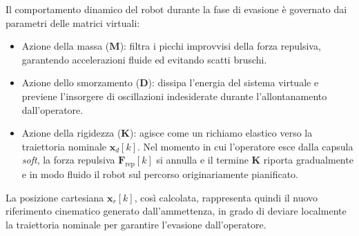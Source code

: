Il comportamento dinamico del robot durante la fase di evasione è governato dai parametri delle matrici virtuali:
\begin{itemize}
	\item Azione della massa ($\boldsymbol{M}$): filtra i picchi improvvisi della forza repulsiva, garantendo accelerazioni fluide ed evitando scatti bruschi.
	\item Azione dello smorzamento ($\boldsymbol{D}$): dissipa l'energia del sistema virtuale e previene l'insorgere di oscillazioni indesiderate durante l'allontanamento dall'operatore.
	\item Azione della rigidezza ($\boldsymbol{K}$): agisce come un richiamo elastico verso la traiettoria nominale $\boldsymbol{x}_d[k]$. Nel momento in cui l'operatore esce dalla capsula \textit{soft}, la forza repulsiva $\boldsymbol{F}_{\text{rep}}[k]$ si annulla e il termine $\boldsymbol{K}$ riporta gradualmente e in modo fluido il robot sul percorso originariamente pianificato.
\end{itemize}

La posizione cartesiana $\boldsymbol{x}_r[k]$, così calcolata, rappresenta quindi il nuovo riferimento cinematico generato dall'ammettenza, in grado di deviare localmente la traiettoria nominale per garantire l'evasione dall'operatore.
